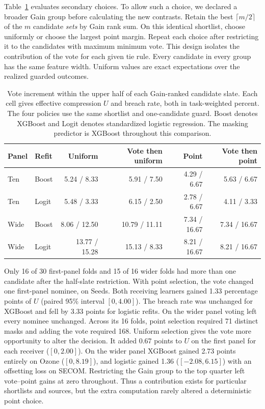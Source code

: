 Table~\ref{tab:gain-matched} evaluates secondary choices. To allow such a choice, we declared a broader Gain group before calculating the new contrasts. Retain the best $\lceil m/2\rceil$ of the $m$ candidate \emph{sets} by Gain rank sum. On this identical shortlist, choose uniformly or choose the largest point margin. Repeat each choice after restricting it to the candidates with maximum minimum vote. This design isolates the contribution of the vote for each given tie rule. Every candidate in every group has the same feature width. Uniform values are exact expectations over the realized guarded outcomes.

\begin{table}[tb]
\centering\small
\caption{Vote increment within the upper half of each Gain-ranked candidate slate. Each cell gives effective compression $U$ and breach rate, both in task-weighted percent. The four policies use the same shortlist and one-candidate guard. Boost denotes XGBoost and Logit denotes standardized logistic regression. The masking predictor is XGBoost throughout this comparison.}
\label{tab:gain-matched}
\setlength{\tabcolsep}{5pt}
\begin{tabular}{@{}llrrrr@{}}
\toprule
Panel & Refit & Uniform & Vote then uniform & Point & Vote then point\\
\midrule
Ten & Boost & 5.24 / 8.33 & 5.91 / 7.50 & 4.29 / 6.67 & 5.63 / 6.67\\
Ten & Logit & 5.48 / 3.33 & 6.15 / 2.50 & 2.78 / 6.67 & 4.11 / 3.33\\
Wide & Boost & 8.06 / 12.50 & 10.79 / 11.11 & 7.34 / 16.67 & 7.34 / 16.67\\
Wide & Logit & 13.77 / 15.28 & 15.13 / 8.33 & 8.21 / 16.67 & 8.21 / 16.67\\
\bottomrule
\end{tabular}
\end{table}

Only 16 of 30 first-panel folds and 15 of 16 wider folds had more than one candidate after the half-slate restriction. With point selection, the vote changed one first-panel nominee, on Seeds. Both receiving learners gained 1.33 percentage points of $U$ (paired 95\% interval $[0,4.00]$). The breach rate was unchanged for XGBoost and fell by 3.33 points for logistic refits. On the wider panel voting left every nominee unchanged. Across its 16 folds, point selection required 71 distinct masks and adding the vote required 168. Uniform selection gives the vote more opportunity to alter the decision. It added 0.67 points to $U$ on the first panel for each receiver ($[0,2.00]$). On the wider panel XGBoost gained 2.73 points entirely on Ozone ($[0,8.19]$), and logistic gained 1.36 ($[-2.08,6.15]$) with an offsetting loss on SECOM. Restricting the Gain group to the top quarter left vote--point gains at zero throughout. Thus a contribution exists for particular shortlists and sources, but the extra computation rarely altered a deterministic point choice.


